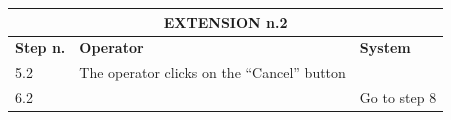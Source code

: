 {{{\begin{center}
			\begin{tabular}{|p{2cm}|p{6cm}|p{6cm}|}
			\hline
				\multicolumn{3}{|c|}{EXTENSION n.2} \\
			\hline
				\centering \vspace{1mm} \bfseries{Step n.} \vspace{1mm} & \vspace{1mm} \bfseries{Operator} \vspace{1mm} & \vspace{1mm} \bfseries{System} \vspace{1mm}\\
			\hline
				\vspace{1mm} 5.2 \vspace{1mm} &
				\vspace{1mm} The operator clicks on the “Cancel” button\vspace{1mm} & 
				\vspace{1mm} \vspace{1mm} \\
			\hline
				\vspace{1mm} 6.2\vspace{1mm} &
				\vspace{1mm} \vspace{1mm} & 
				\vspace{1mm} Go to step 8\vspace{1mm} \\
			\hline
			\end{tabular}
			\end{center}

			\clearpage

}}}
